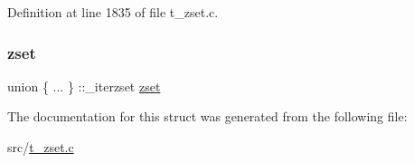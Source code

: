 Definition at line 1835 of file t\+\_\+zset.\+c.

\mbox{\label{structzsetopsrc_a70d92d92e5ed083a01384708f2e5c6eb}} 
\subsubsection{\texorpdfstring{zset}{zset}}
{\footnotesize\ttfamily union \{ ... \} \+::\+\_\+iterzset  \hyperlink{structzset}{zset}}



The documentation for this struct was generated from the following file\+:\begin{DoxyCompactItemize}
\item 
src/\hyperlink{t__zset_8c}{t\+\_\+zset.\+c}\end{DoxyCompactItemize}
